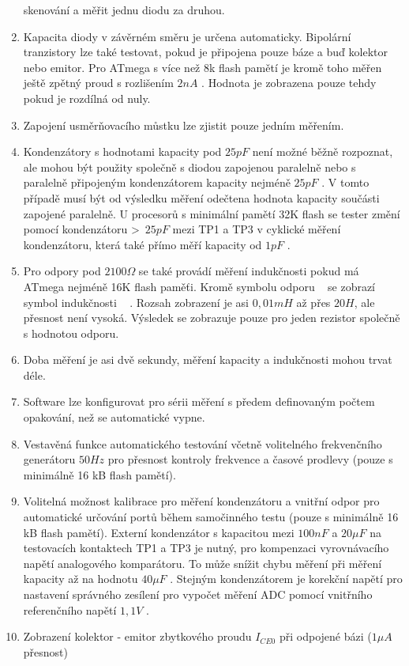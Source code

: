 \begin{enumerate}
skenování a měřit jednu diodu za druhou.
\item Kapacita diody v závěrném směru je určena automaticky.
Bipolární tranzistory lze také testovat, pokud je připojena pouze báze a buď kolektor nebo emitor.
Pro ATmega s více než 8k flash pamětí je kromě toho měřen ještě zpětný proud s rozlišením \(2nA\) .
Hodnota je zobrazena pouze tehdy pokud je rozdílná od nuly.
\item Zapojení usměrňovacího můstku lze zjistit pouze jedním měřením.
\item Kondenzátory s hodnotami kapacity pod \(25pF\) není možné běžně rozpoznat, 
ale mohou být použity společně s diodou zapojenou paralelně nebo s paralelně připojeným kondenzátorem
kapacity nejméně \(25pF\) .
V tomto případě musí být od výsledku měření odečtena hodnota kapacity součásti zapojené paralelně.
U procesorů s minimální pamětí 32K flash se tester změní pomocí kondenzátoru \textgreater~\(25pF\)
mezi TP1 a TP3 v cyklické měření kondenzátoru, která také přímo měří kapacity od \(1pF\) .
\item Pro odpory pod \(2100\Omega\) se také provádí měření indukčnosti pokud
má ATmega nejméně 16K flash paměťi.
Kromě symbolu odporu \mbox{~\electricR} se zobrazí symbol indukčnosti \mbox{~\electricL} .
Rozsah zobrazení je asi \(0,01mH\) až přes \(20H\), ale přesnost není vysoká.
Výsledek se zobrazuje pouze pro jeden rezistor společně s hodnotou odporu.
\item Doba měření je asi dvě sekundy, měření kapacity a indukčnosti mohou trvat déle.
\item Software lze konfigurovat pro sérii měření s předem definovaným počtem opakování, než se automatické vypne.
\item Vestavěná funkce automatického testování včetně volitelného frekvenčního generátoru \(50Hz\) 
pro přesnost kontroly frekvence
a časové prodlevy (pouze s minimálně 16 kB flash pamětí).
\item Volitelná možnost kalibrace pro měření kondenzátoru a vnitřní odpor pro
automatické určování portů během samočinného testu (pouze s minimálně 16 kB flash pamětí).
Externí kondenzátor s kapacitou mezi \(100nF\) a \(20\mu F\) na testovacích kontaktech TP1 a TP3 je nutný, 
pro kompenzaci vyrovnávacího napětí analogového komparátoru.
To může snížit chybu měření při měření kapacity až na hodnotu \(40\mu F\) .
Stejným kondenzátorem je korekční napětí pro nastavení správného zesílení pro
vypočet měření ADC pomocí vnitřního referenčního napětí \(1,1V\) .
\item Zobrazení kolektor - emitor zbytkového proudu \(I_{CE0}\) při odpojené bázi (\(1\mu A\) přesnost) 

\end{enumerate}
